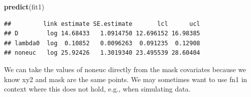 \documentclass[
]{book}
\newenvironment{Shaded}{\begin{snugshade}}{\end{snugshade}}
\newcommand{\AttributeTok}[1]{\textcolor[rgb]{0.13,0.29,0.53}{#1}}
\newcommand{\CommentTok}[1]{\textcolor[rgb]{0.56,0.35,0.01}{\textit{#1}}}
\newcommand{\ConstantTok}[1]{\textcolor[rgb]{0.56,0.35,0.01}{#1}}
\newcommand{\ControlFlowTok}[1]{\textcolor[rgb]{0.13,0.29,0.53}{\textbf{#1}}}
\newcommand{\DecValTok}[1]{\textcolor[rgb]{0.00,0.00,0.81}{#1}}
\newcommand{\FunctionTok}[1]{\textcolor[rgb]{0.13,0.29,0.53}{\textbf{#1}}}
\newcommand{\NormalTok}[1]{#1}
\newcommand{\OtherTok}[1]{\textcolor[rgb]{0.56,0.35,0.01}{#1}}
\newcommand{\SpecialCharTok}[1]{\textcolor[rgb]{0.81,0.36,0.00}{\textbf{#1}}}
\newcommand{\StringTok}[1]{\textcolor[rgb]{0.31,0.60,0.02}{#1}}
\begin{document}
\begin{Shaded}
\end{Shaded}

\begin{Shaded}
\begin{Highlighting}[]
\FunctionTok{predict}\NormalTok{(fit1)}
\end{Highlighting}
\end{Shaded}

\begin{verbatim}
##         link estimate SE.estimate       lcl      ucl
## D        log 14.68433   1.0914750 12.696152 16.98385
## lambda0  log  0.10852   0.0096263  0.091235  0.12908
## noneuc   log 25.92426   1.3019340 23.495539 28.60404
\end{verbatim}

We can take the values of noneuc directly from the mask covariates because we know xy2 and mask are the same points. We may sometimes want to use fn1 in context where this does not hold, e.g., when simulating data.
\end{document}
